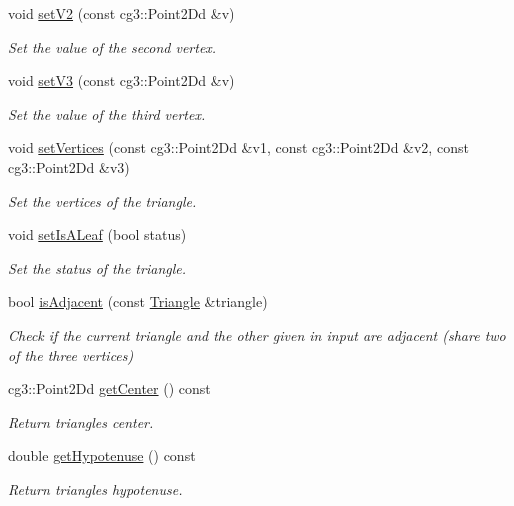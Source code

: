 \begin{DoxyCompactItemize}
void \hyperlink{classTriangle_a5480bcac5b89d6d9f9264f7e2ef2e6f9}{set\+V2} (const cg3\+::\+Point2\+Dd \&v)
\begin{DoxyCompactList}\small\item\em Set the value of the second vertex. \end{DoxyCompactList}\item 
void \hyperlink{classTriangle_aa4f71f3556101b310e026c450f9f2335}{set\+V3} (const cg3\+::\+Point2\+Dd \&v)
\begin{DoxyCompactList}\small\item\em Set the value of the third vertex. \end{DoxyCompactList}\item 
void \hyperlink{classTriangle_a811b58ebb5cf40b603b62cfe3c4035fd}{set\+Vertices} (const cg3\+::\+Point2\+Dd \&v1, const cg3\+::\+Point2\+Dd \&v2, const cg3\+::\+Point2\+Dd \&v3)
\begin{DoxyCompactList}\small\item\em Set the vertices of the triangle. \end{DoxyCompactList}\item 
void \hyperlink{classTriangle_aa5389d1d6bee855ffa358313c76b54ed}{set\+Is\+A\+Leaf} (bool status)
\begin{DoxyCompactList}\small\item\em Set the status of the triangle. \end{DoxyCompactList}\item 
bool \hyperlink{classTriangle_a3d6e11f16208fb48d84bd7e2381d42cf}{is\+Adjacent} (const \hyperlink{classTriangle}{Triangle} \&triangle)
\begin{DoxyCompactList}\small\item\em Check if the current triangle and the other given in input are adjacent (share two of the three vertices) \end{DoxyCompactList}\item 
cg3\+::\+Point2\+Dd \hyperlink{classTriangle_a4d120f7288b7051a1cf442268edd328d}{get\+Center} () const
\begin{DoxyCompactList}\small\item\em Return triangle\textquotesingle{}s center. \end{DoxyCompactList}\item 
double \hyperlink{classTriangle_aea05889b09b94496f35019968eb728f7}{get\+Hypotenuse} () const
\begin{DoxyCompactList}\small\item\em Return triangle\textquotesingle{}s hypotenuse. \end{DoxyCompactList}\item 

\end{DoxyCompactItemize}
